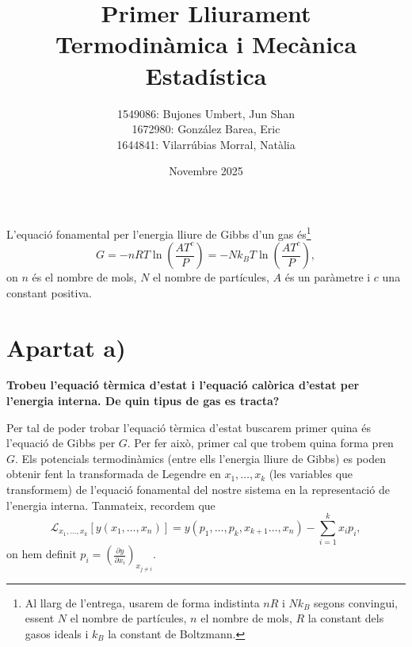 \documentclass[a4paper, 10pt]{article}
\begin{document}
	\title{\Huge{\textbf{Primer Lliurament}} \\ \vspace{0.2cm} \large{\textbf{Termodinàmica i Mecànica Estadística}}}

	\author{\small{1549086: Bujones Umbert, Jun Shan} \\
		\small{1672980: González Barea, Eric} \\
		\small{1644841: Vilarrúbias Morral, Natàlia}}
	\date{Novembre 2025}
	\maketitle
	
	\thispagestyle{fancy}
L'equació fonamental per l'energia lliure de Gibbs d'un gas és\footnote{Al llarg de l'entrega, usarem de forma indistinta $nR$ i $Nk_B$ segons convingui, essent $N$ el nombre de partícules, $n$ el nombre de mols, $R$ la constant dels gasos ideals i $k_B$ la constant de Boltzmann.}
\begin{equation}
	G = -nRT\ln\left(\frac{AT^c}{P}\right) = -Nk_BT\ln\left(\frac{AT^c}{P}\right), \label{eqenunciat}
\end{equation}
on $n$ és el nombre de mols, $N$ el nombre de partícules, $A$ és un paràmetre i $c$ una constant positiva.

\section*{Apartat a)}	
\textbf{Trobeu l’equació tèrmica d’estat i l’equació calòrica d’estat per l’energia interna. De quin tipus de gas es tracta?}

Per tal de poder trobar l'equació tèrmica d'estat buscarem primer quina és l'equació de Gibbs per $G$. Per fer això, primer cal que trobem quina forma pren $G$. Els potencials termodinàmics (entre ells l'energia lliure de Gibbs) es poden obtenir fent la transformada de Legendre en $x_1,\ldots,x_k$ (les variables que transformem) de l'equació fonamental del nostre sistema en la representació de l'energia interna. Tanmateix, recordem que
\begin{equation}
	\mathcal{L}_{x_1,\ldots,x_k}[y(x_1,\ldots,x_n)]=y(p_1,\ldots,p_k,x_{k+1}\ldots,x_n)-\sum_{i=1}^kx_ip_i, \label{legendre}
\end{equation}
on hem definit $p_i = \left(\frac{\partial y}{\partial x_i}\right)_{x_{j\neq i}}$.
\end{document}
